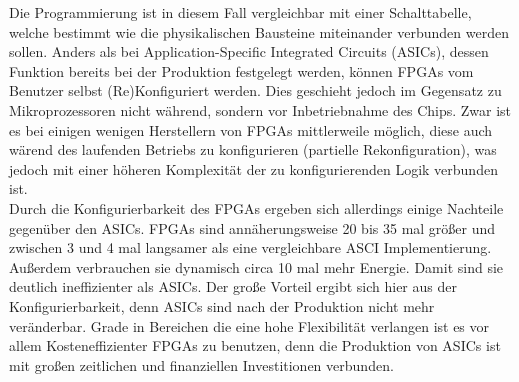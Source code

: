 Die Programmierung ist in diesem Fall vergleichbar mit einer Schalttabelle, welche bestimmt wie die physikalischen Bausteine miteinander verbunden werden sollen. Anders als bei Application-Specific Integrated Circuits
(ASICs), dessen Funktion bereits bei der Produktion festgelegt werden, können FPGAs vom Benutzer selbst (Re)Konfiguriert werden. \newpage 
Dies geschieht jedoch im Gegensatz zu Mikroprozessoren nicht während, sondern vor Inbetriebnahme des Chips. Zwar ist es bei
einigen wenigen Herstellern von FPGAs mittlerweile möglich, diese auch wärend des laufenden Betriebs zu konfigurieren (partielle Rekonfiguration), was jedoch mit einer höheren
Komplexität der zu konfigurierenden Logik verbunden ist.\\
Durch die Konfigurierbarkeit des FPGAs ergeben sich allerdings einige Nachteile gegenüber den ASICs. FPGAs sind annäherungsweise 20 bis 35 mal größer und zwischen 3 und 4 mal langsamer als eine vergleichbare ASCI Implementierung. Außerdem verbrauchen sie dynamisch circa 10 mal mehr Energie. \cite{KURO} Damit sind sie deutlich ineffizienter als ASICs. Der große Vorteil ergibt sich hier aus der Konfigurierbarkeit, denn ASICs sind nach der Produktion nicht mehr veränderbar. Grade in Bereichen die eine hohe Flexibilität verlangen ist es vor allem Kosteneffizienter FPGAs zu benutzen, denn die Produktion von ASICs ist mit großen zeitlichen und finanziellen Investitionen verbunden.\cite{KUTERO}
